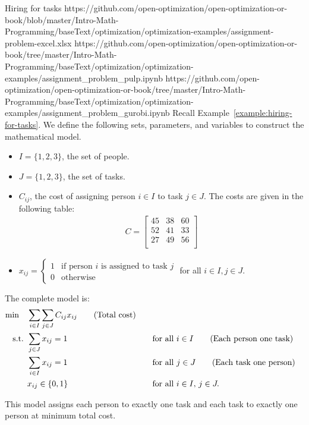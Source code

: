 \begin{examplewithallcode}{Hiring for tasks}
{https://github.com/open-optimization/open-optimization-or-book/blob/master/Intro-Math-Programming/baseText/optimization/optimization-examples/assignment-problem-excel.xlsx}
{https://github.com/open-optimization/open-optimization-or-book/tree/master/Intro-Math-Programming/baseText/optimization/optimization-examples/assignment_problem_pulp.ipynb}
{https://github.com/open-optimization/open-optimization-or-book/tree/master/Intro-Math-Programming/baseText/optimization/optimization-examples/assignment_problem_gurobi.ipynb}
Recall Example~\ref{example:hiring-for-tasks}.  
We define the following sets, parameters, and variables to construct the mathematical model.

\begin{itemize}
    \item $I = \{1, 2, 3\}$, the set of people.
    \item $J = \{1, 2, 3\}$, the set of tasks.
\end{itemize}

\begin{itemize}
    \item $C_{ij}$, the cost of assigning person $i \in I$ to task $j \in J$. The costs are given in the following table:
    \begin{align*}
        C = \begin{bmatrix}
            45 & 38 & 60 \\
            52 & 41 & 33 \\
            27 & 49 & 56 \\
        \end{bmatrix}
    \end{align*}
\end{itemize}

\begin{itemize}
    \item $x_{ij} = 
    \begin{cases} 
    1 & \text{if person } i \text{ is assigned to task } j \\
    0 & \text{otherwise}
    \end{cases}$ for all $i \in I, j \in J$.
\end{itemize}


The complete model is:
\begin{align*}
\min \quad & \sum_{i \in I} \sum_{j \in J} C_{ij} x_{ij}   \tag{Total cost} \\
\text{ s.t. }        & \sum_{j \in J} x_{ij} = 1 &&\quad \text{for all } i \in I   \tag{Each person one task} \\
             & \sum_{i \in I} x_{ij} = 1 &&\quad \text{for all } j \in J   \tag{Each task one person} \\
             & x_{ij} \in \{0,1\} &&\quad \text{for all } i \in I,\, j \in J.
\end{align*}

This model assigns each person to exactly one task and each task to exactly one person at minimum total cost.

\end{examplewithallcode}

